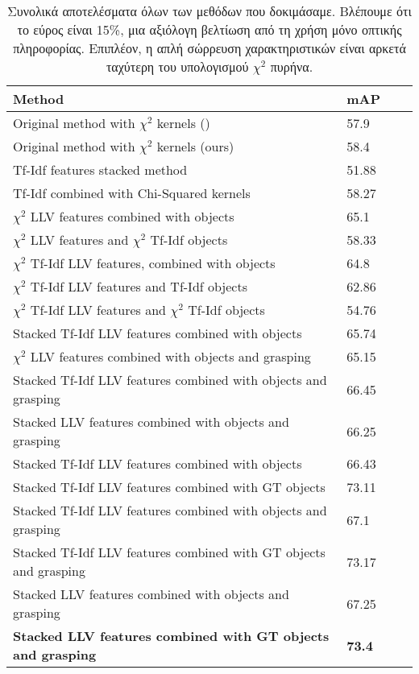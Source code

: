 \documentclass[11pt,a4paper,english,greek,twoside]{../Thesis}
\begin{document}
\begin{table}[H]
	\centering
    \begin{tabular}{| l | l | l | l |}
    \hline
    \textbf{Method} & \textbf{mAP} \\ \hline
    Original method with $\chi^2$ kernels (\cite{rohrbach_2012}) & 57.9 \\ \hline
    Original method with $\chi^2$ kernels (ours) & 58.4 \\ \hline
    Tf-Idf features stacked method & 51.88 \\ \hline
    Tf-Idf combined with Chi-Squared kernels & 58.27 \\ \hline
    $\chi^2$ LLV features combined with objects & 65.1 \\ \hline
    $\chi^2$ LLV features and $\chi^2$ Tf-Idf objects & 58.33 \\ \hline
    $\chi^2$ Tf-Idf LLV features, combined with objects & 64.8 \\ \hline
    $\chi^2$ Tf-Idf LLV features and Tf-Idf objects & 62.86 \\ \hline
    $\chi^2$ Tf-Idf LLV features and $\chi^2$ Tf-Idf objects  & 54.76 \\ \hline
    Stacked Tf-Idf LLV features combined with objects & 65.74 \\ \hline
    $\chi^2$ LLV features combined with objects and grasping & 65.15 \\ \hline
    Stacked Tf-Idf LLV features combined with objects and grasping & 66.45 \\ \hline
    Stacked LLV features combined with objects and grasping & 66.25 \\ \hline
    Stacked Tf-Idf LLV features combined with objects & 66.43 \\ \hline
    Stacked Tf-Idf LLV features combined with GT objects & 73.11 \\ \hline
    Stacked Tf-Idf LLV features combined with objects and grasping & 67.1 \\ \hline
    Stacked Tf-Idf LLV features combined with GT objects and grasping & 73.17 \\ \hline
    Stacked LLV features combined with objects and grasping & 67.25 \\ \hline
    \textbf{Stacked LLV features combined with GT objects and grasping} & \textbf{73.4} \\
    \hline
    \end{tabular}
	\label{tab:TotalResults}
	\caption{Συνολικά αποτελέσματα όλων των μεθόδων που δοκιμάσαμε. Βλέπουμε ότι το εύρος είναι 15\%, μια αξιόλογη βελτίωση από τη χρήση μόνο οπτικής πληροφορίας. Επιπλέον, η απλή σώρρευση χαρακτηριστικών είναι αρκετά ταχύτερη του υπολογισμού $\chi^2$ πυρήνα.}
\end{table}
\end{document}
